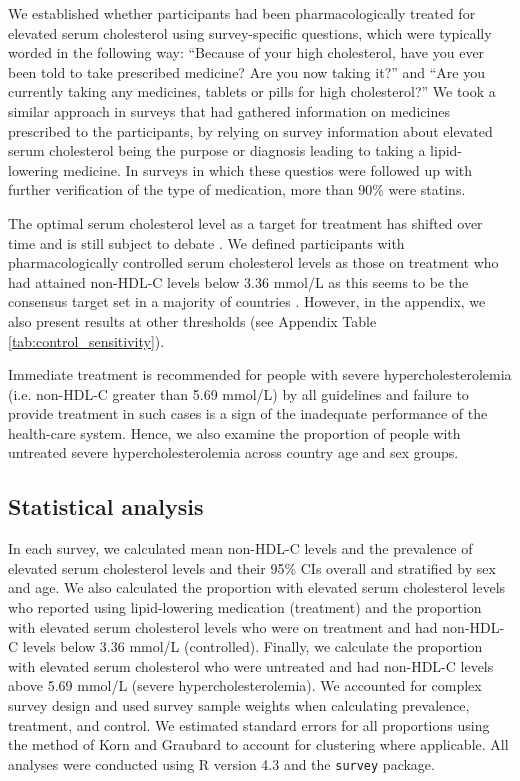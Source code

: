 \documentclass[12pt]{article}
\begin{document}
\begin{refsection}
We established whether participants had been pharmacologically treated for elevated serum cholesterol using survey-specific questions, which were typically worded in the following way: ``Because of your high cholesterol, have you ever been told to take prescribed medicine? Are you now taking it?'' and ``Are you currently taking any medicines, tablets or pills for high cholesterol?'' We took a similar approach in surveys that had gathered information on medicines prescribed to the participants, by relying on survey information about elevated serum cholesterol being the purpose or diagnosis leading to taking a lipid-lowering medicine. In surveys in which these questios were followed up with further verification of the type of medication, more than 90\% were statins.

The optimal serum cholesterol level as a target for treatment has shifted over time and is still subject to debate \cite{grundy_statin_1998,deedwania_reduction_2006}. We defined participants with pharmacologically controlled serum cholesterol levels as those on treatment who had attained non-HDL-C levels below 3.36 mmol/L as this seems to be the consensus target set in a majority of countries \cite{mach_2019_2020,grundy_scott_m_2018_2019,rhee_2018_2019}. However, in the appendix, we also present results at other thresholds (see Appendix Table \ref{tab:control_sensitivity}).

Immediate treatment is recommended for people with severe hypercholesterolemia (i.e. non-HDL-C greater than 5.69 mmol/L) by all guidelines and failure to provide treatment in such cases is a sign of the inadequate performance of the health-care system. Hence, we also examine the proportion of people with untreated severe hypercholesterolemia across country age and sex groups.

\subsection{Statistical analysis}
In each survey, we calculated mean non-HDL-C levels and the prevalence of elevated serum cholesterol levels and their 95\% CIs overall and stratified by sex and age. We also calculated the proportion with elevated serum cholesterol levels who reported using lipid-lowering medication (treatment) and the proportion with elevated serum cholesterol levels who were on treatment and had non-HDL-C levels below 3.36 mmol/L (controlled). Finally, we calculate the proportion with elevated serum cholesterol who were untreated and had non-HDL-C levels above 5.69 mmol/L (severe hypercholesterolemia). We accounted for complex survey design and used survey sample weights when calculating prevalence, treatment, and control. We estimated standard errors for all proportions using the method of Korn and Graubard \cite{korn_confidence_1998} to account for clustering where applicable. All analyses were conducted using R version 4.3 and the \texttt{survey} package.


\end{refsection}
\end{document}
